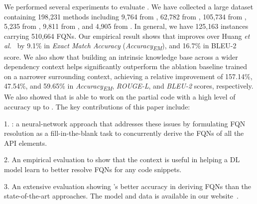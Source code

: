 We performed several experiments to evaluate {\tool}. We have
collected a large dataset containing 198,231 methods including 9,764
from , 62,782 from , 105,734 from
, 5,235 from , 9,811 from ,
and 4,905 from .  In general, we have 125,163 instances
carrying 510,664 FQNs. Our empirical result shows that {\tool}
improves over Huang {\em et al.}~\cite{prompt-ase22} by 9.1\% in {\em
  Exact Match Accuracy} (\textit{Accuracy\textsubscript{EM}}), and
16.7\% in BLEU-2 score. We also show that building an intrinsic
knowledge base across a wider dependency context helps \tool
significantly outperform the ablation baseline trained on a narrower
surrounding context, achieving a relative improvement of 157.14\%,
47.54\%, and 59.65\% in \textit{Accuracy\textsubscript{EM}},
\textit{ROUGE-L}, and \textit{BLEU-2} scores, respectively. We also
showed that {\tool} is able to work on the partial code with a high
level of accuracy up to {}. The key
  contributions of this paper include:

1. {\bf {\tool}}: a neural-network approach that addresses these issues by
formulating FQN resolution as a fill-in-the-blank task to concurrently
derive the FQNs of all the API elements.

2. An empirical evaluation to show that the context is useful
in helping a DL model learn to better resolve FQNs for any code
snippets.

3. An extensive evaluation showing {\tool}'s better accuracy in
deriving FQNs than the state-of-the-art approaches.
%
The model and data is available in our website~\cite{deepfqn}.
